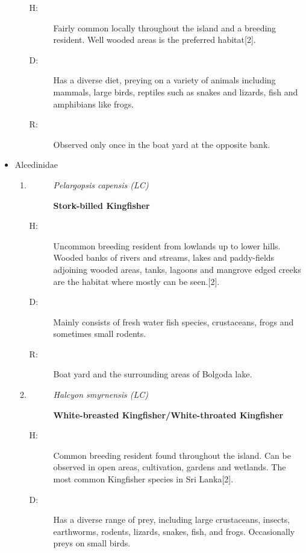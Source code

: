\begin{itemize}
\begin{enumerate}
\begin{description}%
\item[H: ]%
Fairly common locally throughout the island and a breeding resident. Well wooded areas is the preferred habitat{[}2{]}.%
\item[D: ]%
Has a diverse diet, preying on a variety of animals including mammals, large birds, reptiles such as snakes and lizards, fish and amphibians like frogs.%
\item[R: ]%
Observed only once in the boat yard at the opposite bank.%
\end{description}%
\end{enumerate}%
\item%
Alcedinidae%
\begin{enumerate}%
\item%
\begin{description}%
\item[]%
\textit{Pelargopsis capensis (LC)}%
\item[]%
\textbf{Stork{-}billed Kingfisher}%
\end{description}%
\begin{description}%
\item[H: ]%
Uncommon breeding resident from lowlands up to lower hills. Wooded banks of rivers and streams, lakes and paddy-fields adjoining wooded areas, tanks, lagoons and mangrove edged creeks are the habitat where mostly can be seen.{[}2{]}.%
\item[D: ]%
Mainly consists of fresh water fish species, crustaceans, frogs and sometimes small rodents.%
\item[R: ]%
Boat yard and the surrounding areas of Bolgoda lake.%
\end{description}%
\item%
\begin{description}%
\item[]%
\textit{Halcyon smyrnensis (LC)}%
\item[]%
\textbf{White{-}breasted Kingfisher/White{-}throated Kingfisher}%
\end{description}%
\begin{description}%
\item[H: ]%
Common breeding resident found throughout the island. Can be observed in open areas, cultivation, gardens and wetlands. The most common Kingfisher species in Sri Lanka{[}2{]}.%
\item[D: ]%
Has a diverse range of prey, including large crustaceans, insects, earthworms, rodents, lizards, snakes, fish, and frogs. Occasionally preys on small birds.%

\end{description}
\end{enumerate}
\end{itemize}

